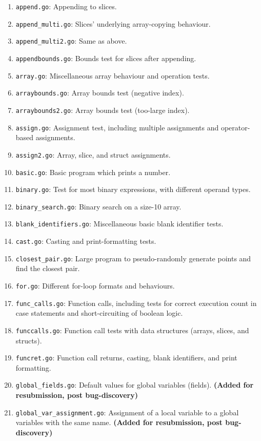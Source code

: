 \documentclass[11pt]{article}
\begin{document}
\begin{enumerate}
\item \texttt{append.go}: Appending to slices.
\item \texttt{append\_multi.go}: Slices' underlying array-copying behaviour.
\item \texttt{append\_multi2.go}: Same as above.
\item \texttt{appendbounds.go}: Bounds test for slices after appending.
\item \texttt{array.go}: Miscellaneous array behaviour and operation tests.
\item \texttt{arraybounds.go}: Array bounds test (negative index).
\item \texttt{arraybounds2.go}: Array bounds test (too-large index).
\item \texttt{assign.go}: Assignment test, including multiple assignments and operator-based assignments.
\item \texttt{assign2.go}: Array, slice, and struct assignments.
\item \texttt{basic.go}: Basic program which prints a number.
\item \texttt{binary.go}: Test for most binary expressions, with different operand types.
\item \texttt{binary\_search.go}: Binary search on a size-10 array.
\item \texttt{blank\_identifiers.go}: Miscellaneous basic blank identifier tests.
\item \texttt{cast.go}: Casting and print-formatting tests.
\item \texttt{closest\_pair.go}: Large program to pseudo-randomly generate points and find the closest pair.
\item \texttt{for.go}: Different for-loop formats and behaviours.
\item \texttt{func\_calls.go}: Function calls, including tests for correct execution count in case statements and short-circuiting of boolean logic.
\item \texttt{funccalls.go}: Function call tests with data structures (arrays, slices, and structs).
\item \texttt{funcret.go}: Function call returns, casting, blank identifiers, and print formatting.
\item \texttt{global\_fields.go}: Default values for global variables (fields). \textbf{(Added for resubmission, post bug-discovery)}
\item \texttt{global\_var\_assignment.go}: Assignment of a local variable to a global variables with the same name. \textbf{(Added for resubmission, post bug-discovery)}

\end{enumerate}
\end{document}
